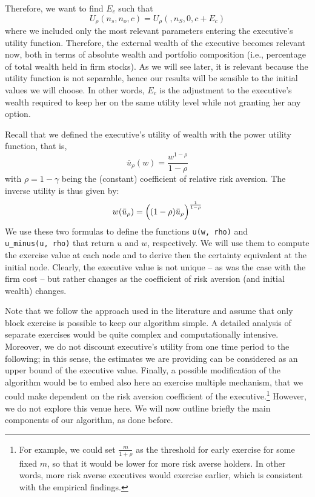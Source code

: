 Therefore, we want to find $E_c$ such that 
$$U_\rho(n_s, n_o, c) = U_\rho(, n_S, 0, c + E_c) $$ %
where we included only the most relevant parameters entering the executive's utility function. Therefore, the external wealth of the executive becomes relevant now, both in terms of absolute wealth and portfolio composition (i.e., percentage of total wealth held in firm stocks). As we will see later, it is relevant because the utility function is not separable, hence our results will be sensible to the initial values we will choose. In other words, $E_c$ is the adjustment to the executive's wealth required to keep her on the same utility level while not granting her any option.

Recall that we defined the executive's utility of wealth with the power utility function, that is, 
$$\bar{u}_\rho(w) = \frac{w^{1-\rho}}{1-\rho}$$
with $\rho = 1 - \gamma $ being the (constant) coefficient of relative risk aversion. 
The inverse utility is thus given by:
$$w(\bar{u}_\rho) = \Bigl( (1-\rho)\bar{u}_\rho \Bigr)^{\frac{1}{1-\rho}}$$
We use these two formulas to define the functions \verb|u(w, rho)| and \\
\verb|u_minus(u, rho)| that return $u$ and $w$, respectively. We will use them to compute the exercise value at each node and to derive then the certainty equivalent at the initial node. Clearly, the executive value is not unique -- as was the case with the firm cost -- but rather changes as the coefficient of risk aversion (and initial wealth) changes.


Note that we follow the approach used in the literature and assume that only block exercise is possible  to keep our algorithm simple. A detailed analysis of separate exercises would be quite complex and computationally intensive. Moreover, we do not discount executive's utility from one time period to the following; in this sense, the estimates we are providing can be considered as an upper bound of the executive value.
Finally, a possible modification of the algorithm would be to embed also here an exercise multiple mechanism, that we could make dependent on the risk aversion coefficient of the executive.\footnote{For example, we could set $\frac{m}{1+\rho}$ as the threshold for early exercise for some fixed $m$, so that it would be lower for more risk averse holders. In other words, more risk averse executives would exercise earlier, which is consistent with the empirical findings.} However, we do not explore this venue here.
We will now outline briefly the main components of our algorithm, as done before.

